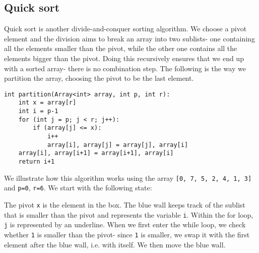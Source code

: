 \documentclass[a4paper, openany]{memoir}
\begin{document}
\subsection{Quick sort}
Quick sort is another divide-and-conquer sorting algorithm. We choose a pivot element and the division aims to break an array into two sublists- one containing all the elements smaller than the pivot, while the other one contains all the elements bigger than the pivot. Doing this recursively ensures that we end up with a sorted array- there is no combination step. The following is the way we partition the array, choosing the pivot to be the last element.
\begin{lstlisting}[language=pseudocode]
int partition(Array<int> array, int p, int r):
    int x = array[r]
    int i = p-1
    for (int j = p; j < r; j++):
        if (array[j] <= x):
            i++
            array[i], array[j] = array[j], array[i]
    array[i], array[i+1] = array[i+1], array[i]
    return i+1
\end{lstlisting}
We illustrate how this algorithm works using the array \texttt{[0, 7, 5, 2, 4, 1, 3]} and \texttt{p=0}, \texttt{r=6}. We start with the following state:
\begin{center}
\end{center}
The pivot \texttt{x} is the element in the box. The blue wall keeps track of the sublist that is smaller than the pivot and represents the variable \texttt{i}. Within the for loop, \texttt{j} is represented by an underline. When we first enter the while loop, we check whether \texttt{1} is smaller than the pivot- since \texttt{1} is smaller, we swap it with the first element after the blue wall, i.e. with itself. We then move the blue wall.
\begin{center}
\end{center}
\end{document}
